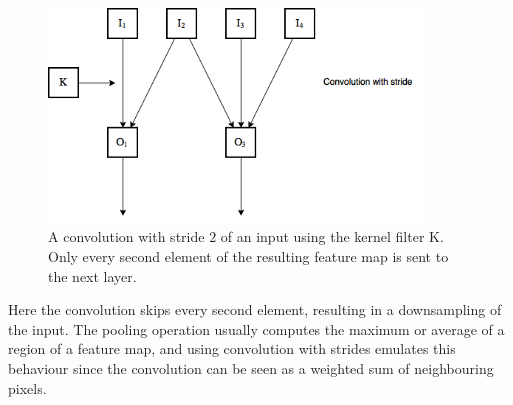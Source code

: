 \documentclass[11pt]{article}
\begin{document}
\begin{figure}[!h]\label{con2}
    \centering
    \includegraphics[width=10cm]{include/strides.png}
    \caption{A convolution with stride $2$ of an input using the kernel filter K. Only every second
        element of the resulting feature map is sent to the next layer.}
    \label{fig:conv}
\end{figure}

Here the convolution skips every second element, resulting in a downsampling
of the input.
The pooling operation usually computes the maximum or average of a region of a feature map,
and using convolution with strides emulates this behaviour since the convolution
can be seen as a weighted sum of neighbouring pixels.



%
%
\end{document}
